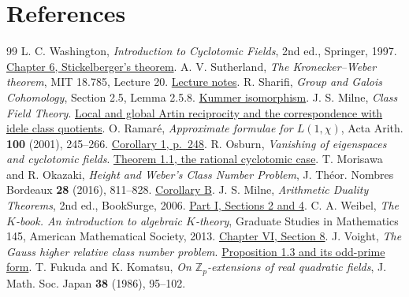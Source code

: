 \documentclass[a4paper,11pt]{article}
\theoremstyle{definition}
\theoremstyle{remark}
\newcommand{\ZZ}{\mathbb Z}\newcommand{\ord}{\operatorname{ord}}
\numberwithin{equation}{section}
\begin{document}
\clearpage
\section{References}\label{nav:bibliography-V}
\begingroup{}\begin{thebibliography}{99}\small
{} L. C. Washington, \emph{Introduction to Cyclotomic Fields}, 2nd ed., Springer, 1997. \href{https://link.springer.com/book/10.1007/978-1-4612-1934-7}{Chapter 6, Stickelberger's theorem}.
 A. V. Sutherland, \emph{The Kronecker--Weber theorem}, MIT 18.785, Lecture 20. \href{https://ocw.mit.edu/courses/18-785-number-theory-i-fall-2021/mit18_785f21_lec20.pdf}{Lecture notes}.
 R. Sharifi, \emph{Group and Galois Cohomology}, Section 2.5, Lemma 2.5.8. \href{https://www.math.ucla.edu/~sharifi/notes/groupcoh-ch02.html}{Kummer isomorphism}.
 J. S. Milne, \emph{Class Field Theory}. \href{https://www.jmilne.org/math/CourseNotes/CFT.pdf}{Local and global Artin reciprocity and the correspondence with idele class quotients}.
 O. Ramar\'e, \emph{Approximate formulae for \(L(1,\chi)\)}, Acta Arith. \textbf{100} (2001), 245--266. \href{https://www.impan.pl/shop/en/publication/transaction/download/product/83550}{Corollary 1, p.~248}.
 R. Osburn, \emph{Vanishing of eigenspaces and cyclotomic fields}. \href{https://arxiv.org/abs/math/0412242}{Theorem 1.1, the rational cyclotomic case}.
 T. Morisawa and R. Okazaki, \emph{Height and Weber's Class Number Problem}, J. Th\'eor. Nombres Bordeaux \textbf{28} (2016), 811--828. \href{https://www.numdam.org/item/10.5802/jtnb.965.pdf}{Corollary B}.
 J. S. Milne, \emph{Arithmetic Duality Theorems}, 2nd ed., BookSurge, 2006. \href{https://www.jmilne.org/math/Books/ADTnot.pdf}{Part I, Sections 2 and 4}.
 C. A. Weibel, \emph{The \(K\)-book. An introduction to algebraic \(K\)-theory}, Graduate Studies in Mathematics 145, American Mathematical Society, 2013. \href{https://sites.math.rutgers.edu/~weibel/Kbook/Kbook.VI.pdf}{Chapter VI, Section 8}.
 J. Voight, \emph{The Gauss higher relative class number problem}. \href{https://jvoight.github.io/articles/higherrel-062618.pdf}{Proposition 1.3 and its odd-prime form}.
 T. Fukuda and K. Komatsu, \emph{On \(\ZZ_p\)-extensions of real quadratic fields}, J. Math. Soc. Japan \textbf{38} (1986), 95--102.

\end{thebibliography}
\end{document}

